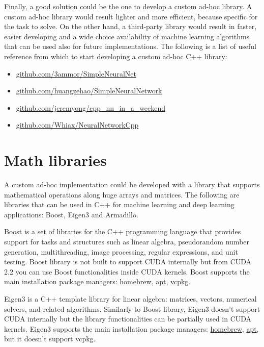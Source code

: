 Finally, a good solution could be the one to develop a custom ad-hoc library. A custom ad-hoc library would result lighter and more efficient, because specific for the task to solve. On the other hand, a third-party library would result in faster, easier developing and a wide choice availability of machine learning algorithms that can be used also for future implementations. The following is a list of useful reference from which to start developing a custom ad-hoc C++ library:
\begin{itemize}
	\item \href{https://github.com/3ammor/SimpleNeuralNet/tree/master/NeuralNetwork}{github.com/3ammor/SimpleNeuralNet}
	\item \href{https://github.com/huangzehao/SimpleNeuralNetwork}{github.com/huangzehao/SimpleNeuralNetwork}
	\item \href{https://github.com/jeremyong/cpp_nn_in_a_weekend}{github.com/jeremyong/cpp\_nn\_in\_a\_weekend}
	\item \href{https://github.com/Whiax/NeuralNetworkCpp}{github.com/Whiax/NeuralNetworkCpp}
\end{itemize}

\section{Math libraries}

A custom ad-hoc implementation could be developed with a library that supports mathematical operations along huge arrays and matrices. The following are libraries that can be used in C++ for machine learning and deep learning applications: Boost, Eigen3 and Armadillo. 

Boost is a set of libraries for the C++ programming language that provides support for tasks and structures such as linear algebra, pseudorandom number generation, multithreading, image processing, regular expressions, and unit testing. Boost library is not built to support CUDA internally but from CUDA 2.2 you can use Boost functionalities inside CUDA kernels. Boost supports the main installation package managers: \href{https://formulae.brew.sh/formula/boost}{homebrew}, \href{https://www.osetc.com/en/how-to-install-boost-on-ubuntu-16-04-18-04-linux.html}{apt}, \href{https://docs.microsoft.com/en-us/cpp/build/manage-libraries-with-vcpkg?view=msvc-160&tabs=windows}{vcpkg}.

Eigen3 is a C++ template library for linear algebra: matrices, vectors, numerical solvers, and related algorithms. Similarly to Boost library, Eigen3 doesn't support CUDA internally but the library functionalities can be partially used in CUDA kernels. Eigen3 supports the main installation package managers: \href{https://formulae.brew.sh/formula/eigen}{homebrew}, \href{https://ubuntu.pkgs.org/18.04/ubuntu-universe-amd64/libeigen3-dev_3.3.4-4_all.deb.html}{apt}, but it doesn't support vcpkg.

